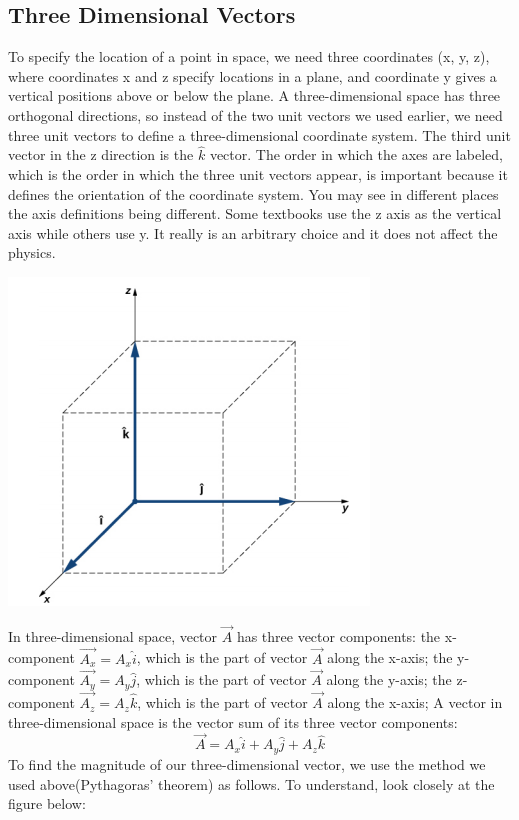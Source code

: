 \documentclass[9pt]{article}
\begin{document}
\subsection*{Three Dimensional Vectors}
To specify the location of a point in space, we need three coordinates (x, y, z), where coordinates x and z specify locations in a plane, and coordinate y gives a vertical positions above or below the plane. A three-dimensional space has three orthogonal directions, so instead of the two unit vectors we used earlier, we need three unit vectors to define a three-dimensional coordinate system. The third unit vector in the z direction is the $\hat{k}$ vector. The order in which the axes are labeled, which is the order in which the three unit vectors appear, is important because it defines the orientation of the coordinate system. You may see in different places the axis definitions being different. Some textbooks use the z axis as the vertical axis while others use y. It really is an arbitrary choice and it does not affect the physics.
\begin{center}
	\includegraphics[scale=0.4]{cartesian_space}
\end{center}
In three-dimensional space, vector $\vec{A}$ has three vector components: the x-component $\vec{A_x}=A_x\hat{i}$, which is the part of vector $\vec{A}$ along the x-axis; the y-component $\vec{A_y}=A_y\hat{j}$, which is the part of vector $\vec{A}$ along the y-axis; the z-component $\vec{A_z}=A_z\hat{k}$, which is the part of vector $\vec{A}$ along the x-axis; A vector in three-dimensional space is the vector sum of its three vector components:
$$\vec{A} = A_{x} \hat{i} + A_{y} \hat{j} + A_{z} \hat{k}$$
To find the magnitude of our three-dimensional vector, we use the method we used above(Pythagoras' theorem) as follows. To understand, look closely at the figure below:
\end{document}
